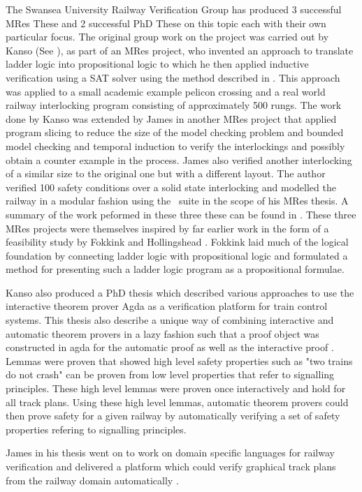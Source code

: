 The Swansea University Railway Verification Group has produced 3 successful MRes These and 2 successful PhD These on this topic each with their own particular focus. The original group work on the project was carried out by Kanso (See \cite{KK08}), as part of an MRes project,  who invented an approach to translate ladder logic into propositional logic to which he then applied inductive verification using a SAT solver \cite{KK09} using the method described in \cite{MS00}. This approach was applied to a small academic example pelicon crossing and a real world railway interlocking program consisting of approximately 500 rungs. The work done by Kanso was extended by James in another MRes project \cite{PJ10} that applied program slicing to reduce the size of the model checking problem and bounded model checking and temporal induction to verify the interlockings and possibly obtain a counter example in the process. James also verified another interlocking of a similar size to the original one but with a different layout. The author verified 100 safety conditions over a solid state interlocking and modelled the railway in a modular fashion using the  \scade \, suite in the scope of his MRes thesis. A summary of the work peformed in these three these can be found in \cite{AL14a}. These three MRes projects were themselves inspired by far earlier work in the form of a feasibility study by Fokkink and Hollingshead \cite{WF98}. Fokkink laid much of the logical foundation by connecting ladder logic with propositional logic and formulated a method for presenting such a ladder logic program as a propositional formulae.

Kanso also produced a PhD thesis \cite{KarimPhD} which described various approaches to use the interactive theorem prover Agda as a verification platform for train control systems. This thesis also describe a unique way of combining interactive and automatic theorem provers in a lazy fashion such that a proof object was constructed in agda for the automatic proof as well as the interactive proof \cite{KarimPaper}. Lemmas were proven that showed high level safety properties such as "two trains do not crash" can be proven from low level properties that refer to  signalling principles. These high level lemmas were proven once interactively and hold for all track plans. Using these high level lemmas, automatic theorem provers could then prove safety for a given railway by automatically verifying a set of safety properties refering to signalling principles.

James in his thesis went on to work on domain specific languages for railway verification and delivered a platform which could verify graphical track plans from the railway domain automatically  \cite{PhilPhD}.


